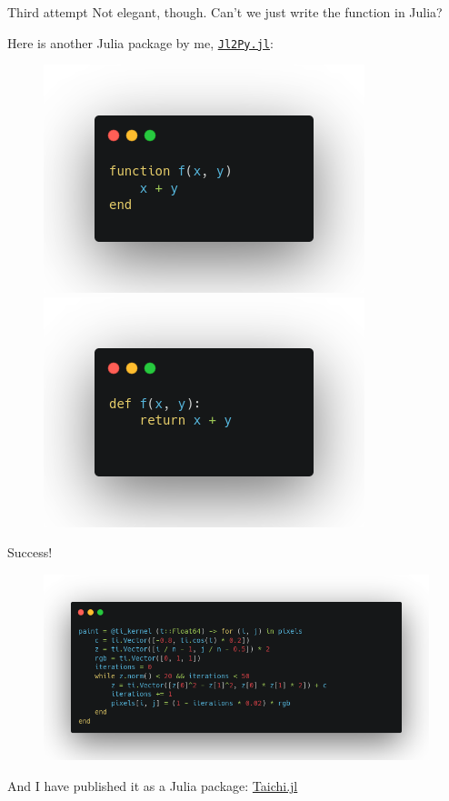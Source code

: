 \documentclass{beamer}
\begin{document}
\begin{frame}[allowframebreaks]{Third attempt}
    Not elegant, though. Can't we just write the function in Julia?

    Here is another Julia package by me, \href{https://github.com/lucifer1004/Jl2Py.jl}{\texttt{Jl2Py.jl}}:

    \begin{figure}[htpb]
        \begin{center}
            \includegraphics[width=.45\linewidth]{pic/code_04.png}
            \includegraphics[width=.45\linewidth]{pic/code_05.png}
        \end{center}
    \end{figure}

    \framebreak

    Success!
    \begin{figure}[htpb]
        \begin{center}
            \includegraphics[width=.8\linewidth]{pic/code_06.png}
        \end{center}
    \end{figure}

    \framebreak
    And I have published it as a Julia package: \href{https://github.com/lucifer1004/Taichi.jl}{Taichi.jl}


\end{frame}
\end{document}
